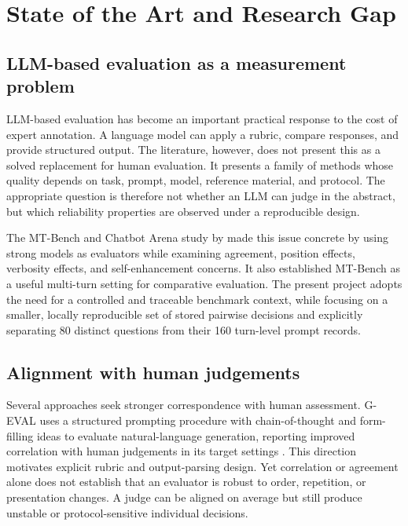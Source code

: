 \chapter{State of the Art and Research Gap}
\label{ch:sota}

\section{LLM-based evaluation as a measurement problem}

LLM-based evaluation has become an important practical response to the cost of expert annotation. A language model can apply a rubric, compare responses, and provide structured output. The literature, however, does not present this as a solved replacement for human evaluation. It presents a family of methods whose quality depends on task, prompt, model, reference material, and protocol. The appropriate question is therefore not whether an LLM can judge in the abstract, but which reliability properties are observed under a reproducible design.

The MT-Bench and Chatbot Arena study by \citet{zheng2023judging} made this issue concrete by using strong models as evaluators while examining agreement, position effects, verbosity effects, and self-enhancement concerns. It also established MT-Bench as a useful multi-turn setting for comparative evaluation. The present project adopts the need for a controlled and traceable benchmark context, while focusing on a smaller, locally reproducible set of stored pairwise decisions and explicitly separating 80 distinct questions from their 160 turn-level prompt records.

\section{Alignment with human judgements}

Several approaches seek stronger correspondence with human assessment. G-EVAL uses a structured prompting procedure with chain-of-thought and form-filling ideas to evaluate natural-language generation, reporting improved correlation with human judgements in its target settings \citep{liu2023geval}. This direction motivates explicit rubric and output-parsing design. Yet correlation or agreement alone does not establish that an evaluator is robust to order, repetition, or presentation changes. A judge can be aligned on average but still produce unstable or protocol-sensitive individual decisions.

